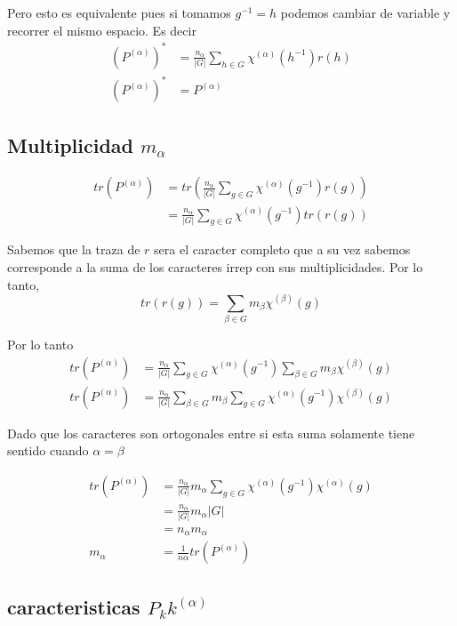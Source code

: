 \documentclass[12pt]{amsart}
\begin{document}
  Pero esto es equivalente pues si tomamos $g^{-1} = h$ podemos cambiar de variable y recorrer el mismo espacio. Es decir
  \begin{align*}
    \left(P^{(\alpha)}\right)^* &= \frac{n_\alpha}{\left| G \right|} \sum_{h \in G} \chi^{(\alpha)}(h^{-1})r(h)\\
    \left(P^{(\alpha)}\right)^* &= P^{(\alpha)}
  \end{align*}

  \subsection{Multiplicidad $m_\alpha$}

  \begin{align*}
    tr(P^{(\alpha)})  &= tr\left(\frac{n_\alpha}{\left| G \right|} \sum_{g \in G} \chi^{(\alpha)}(g^{-1})r(g)\right)\\
    &= \frac{n_\alpha}{\left| G \right|} \sum_{g \in G} \chi^{(\alpha)}(g^{-1})tr\left(r(g)\right)
  \end{align*}

  Sabemos que la traza de $r$ sera el caracter completo que a su vez sabemos corresponde a la suma de los caracteres irrep con sus multiplicidades. Por lo tanto,
  $$tr(r(g)) = \sum_{\beta \in G} m_\beta \chi^{(\beta)}(g)$$

  Por lo tanto
  \begin{align*}
    tr(P^{(\alpha)}) &= \frac{n_\alpha}{\left| G \right|} \sum_{g \in G} \chi^{(\alpha)}(g^{-1})\sum_{\beta \in G} m_\beta \chi^{(\beta)}(g)\\
    tr(P^{(\alpha)}) &= \frac{n_\alpha}{\left| G \right|} \sum_{\beta \in G} m_\beta \sum_{g \in G} \chi^{(\alpha)}(g^{-1})\chi^{(\beta)}(g)
  \end{align*}

  Dado que los caracteres son ortogonales entre si esta suma solamente tiene sentido cuando $\alpha = \beta$

  \begin{align*}
    tr(P^{(\alpha)}) &= \frac{n_\alpha}{\left| G \right|} m_\alpha \sum_{g \in G} \chi^{(\alpha)}(g^{-1})\chi^{(\alpha)}(g)\\
    &= \frac{n_\alpha}{\left| G \right|} m_\alpha \left|G\right|\\
    &= n_\alpha m_\alpha\\
    m_\alpha &= \frac{1}{n\alpha} tr(P^{(\alpha)})
  \end{align*}

  \subsection{caracteristicas $P_kk^{(\alpha)}$}
\end{document}
